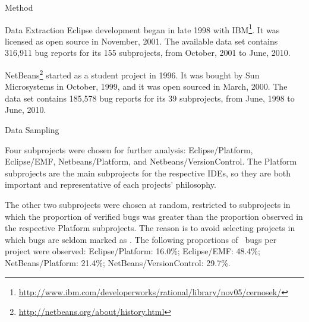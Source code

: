 \begin{section}{Method}
\begin{subsection}{Data Extraction}
	Eclipse development began in late 1998 with IBM\footnote{\url{http://www.ibm.com/developerworks/rational/library/nov05/cernosek/}}. It was licensed as open source in November, 2001. The available data set contains 316,911 bug reports for its 155 subprojects, from October, 2001 to June, 2010.
		
	NetBeans\footnote{\url{http://netbeans.org/about/history.html}} started  as a student project in 1996. It was bought by Sun Microsystems in October, 1999, and it was open sourced in March, 2000. The data set contains 185,578 bug reports for its 39 subprojects, from June, 1998 to June, 2010.
	
\end{subsection}

\begin{subsection}{Data Sampling}

	Four subprojects were chosen for further analysis: Eclipse/Platform, Eclipse/EMF, Netbeans/Platform, and Netbeans/VersionControl. The Platform subprojects are the main subprojects for the respective IDEs, so they are both important and representative of each projects' philosophy. 
	
	The other two subprojects were chosen at random, restricted to subprojects in which the proportion of verified bugs was greater than the proportion observed in the respective Platform subprojects. The reason is to avoid selecting projects in which bugs are seldom marked as \VERIFIED. The following proportions of \VERIFIED\ bugs per project were observed: Eclipse/Platform: 16.0\%; Eclipse/EMF: 48.4\%; NetBeans/Platform: 21.4\%; NetBeans/VersionControl: 29.7\%.
	
	
	
\end{subsection}


\end{section}
